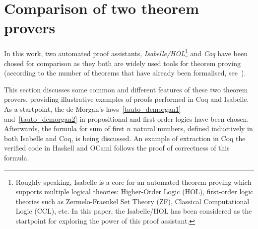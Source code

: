 \documentclass[article]{aaltoseries}
\begin{document}



		




\section{Comparison of two theorem provers}
\label{sec:comparison}

In this work, two automated proof assistants, \textit{Isabelle/HOL}\footnote{Roughly speaking, Isabelle is a core for an automated theorem proving which supports multiple logical theories: Higher-Order Logic (HOL), first-order logic theories such as Zermelo-Fraenkel Set Theory (ZF), Classical Computational Logic (CCL), etc. In this paper, the Isabelle/HOL has been considered as the startpoint for exploring the power of this proof assistant.} and \textit{Coq} have been chosed for comparison as they both are widely used tools for theorem proving (according to the number of theorems that have already been formalised, see~\cite{Wiedijk100}). 

This section discusses some common and different features of these two theorem provers, providing illustrative examples of proofs performed in Coq and Isabelle. As a startpoint, the de Morgan's laws~\eqref{tauto_demorgan1} and~\eqref{tauto_demorgan2} in propositional and first-order logics have been chosen. Afterwards, the formula for sum of first $n$ natural numbers, defined inductively in both Isabelle and Coq, is being discussed. An example of extraction in Coq the verified code in Haskell and OCaml follows the proof of correctness of this formula.
\end{document}
